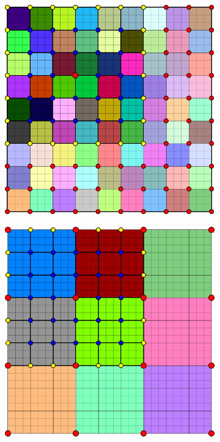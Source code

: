 \begin{figure}[htbp]
  \begin{subfigure}[t]{0.3\textwidth}
    \centerline{\includegraphics[width=0.9\linewidth]{figs/square_cart_struct_node_ml_lvl1_grid}}
  \end{subfigure}
  \hfill
  \begin{subfigure}[t]{0.3\textwidth}
    \centerline{\includegraphics[width=0.9\linewidth]{figs/square_cart_struct_node_ml_lvl2_grid}}

\end{subfigure}
\end{figure}
